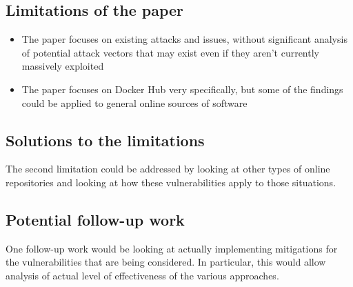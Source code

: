 \documentclass[11pt]{article}
\begin{document}
\subsection*{Limitations of the paper}

\begin{itemize}
\item The paper focuses on existing attacks and issues, without significant analysis of potential attack vectors that may exist even if they aren't currently massively exploited
\item The paper focuses on Docker Hub very specifically, but some of the findings could be applied to general online sources of software
\end{itemize}

\subsection*{Solutions to the limitations}

The second limitation could be addressed by looking at other types of online repositories and looking at how these vulnerabilities apply to those situations.

\subsection*{Potential follow-up work}

One follow-up work would be looking at actually implementing mitigations for the vulnerabilities that are being considered.
In particular, this would allow analysis of actual level of effectiveness of the various approaches.
\end{document}
